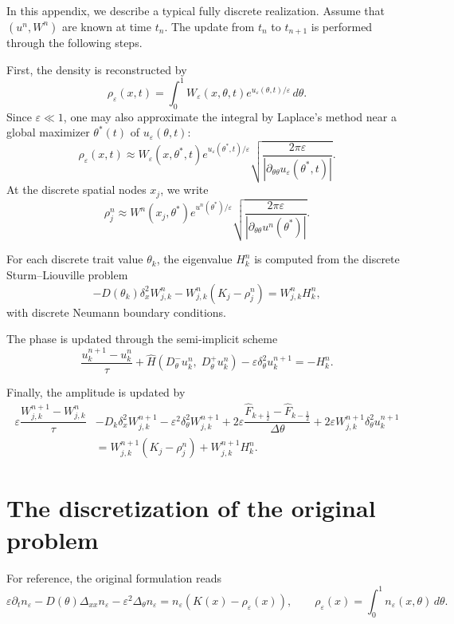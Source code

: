 \documentclass[11pt, dina4, amsfont12]{article}
\begin{document}
In this appendix, we describe a typical fully discrete realization. Assume that $(u^n, W^n)$ are known at time $t_n$. The update from $t_n$ to $t_{n+1}$ is performed through the following steps.

First, the density is reconstructed by
\[
\rho_\varepsilon(x,t)
=
\int_0^1 W_\varepsilon(x,\theta,t)e^{u_\varepsilon(\theta,t)/\varepsilon}\,d\theta.
\]
Since $\varepsilon\ll 1$, one may also approximate the integral by Laplace's method near a global maximizer $\theta^*(t)$ of $u_\varepsilon(\theta,t)$:
\[
\rho_\varepsilon(x,t)
\approx
W_\varepsilon (x, \theta^*, t)
e^{u_\varepsilon(\theta^*,t)/\varepsilon}
\sqrt{\frac{2\pi\varepsilon}{|\partial_{\theta\theta}u_\varepsilon(\theta^*, t)|}}.
\]
At the discrete spatial nodes $x_j$, we write
\[
\rho_j^n
\approx
W^n(x_j, \theta^*) e^{u^n(\theta^*)/\varepsilon}
\sqrt{\frac{2\pi\varepsilon}{|\partial_{\theta\theta}u^n(\theta^*)|}}.
\]

For each discrete trait value $\theta_k$, the eigenvalue $H_k^n$ is computed from the discrete Sturm--Liouville problem
\[
-D(\theta_k)\delta_x^2W_{j,k}^n-W_{j,k}^n(K_j - \rho_j^n)=W_{j,k}^nH_k^n,
\]
with discrete Neumann boundary conditions.

The phase is updated through the semi-implicit scheme
\[
\dfrac{u_k^{n+1} - u_k^n}{\tau}
+\widehat{H} \!\left(D_\theta^- u_k^n,\; D_\theta^+ u_k^n\right)
- \varepsilon \delta_\theta^2 u_k^{n+1}
= -H_k^n.
\]

Finally, the amplitude is updated by
\begin{equation*}
\begin{aligned}
\varepsilon \dfrac{W_{j,k}^{n+1}-W_{j,k}^n}{\tau}
&- D_k\delta_x^2W_{j,k}^{n+1}
- \varepsilon^2 \delta_\theta^2 W_{j,k}^{n+1}
+ 2\varepsilon \dfrac{\widehat{F}_{k+\frac{1}{2}} - \widehat{F}_{k-\frac{1}{2}}}{\Delta\theta}
+ 2\varepsilon W_{j,k}^{n+1}\delta_\theta^2u_k^{n+1} \\
&= W_{j,k}^{n+1}(K_j-\rho_j^n) + W_{j,k}^{n+1}H_k^n.
\end{aligned}
\end{equation*}

\section{The discretization of the original problem}

For reference, the original formulation reads
\[
\varepsilon \partial_t n_\varepsilon - D(\theta)\Delta_{xx}n_\varepsilon -\varepsilon^2\Delta_\theta n_\varepsilon = n_\varepsilon(K(x) - \rho_\varepsilon (x)),
\qquad
\rho_\varepsilon(x) = \int_0^1 n_\varepsilon(x,\theta) \, d\theta.
\]
\end{document}

